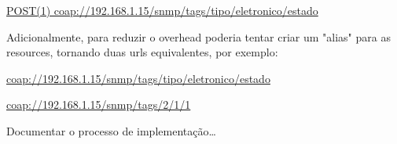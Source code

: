 \documentclass[twoside,english,brazilian]{UNISINOSmonografia}
\begin{document}
\url{POST(1) coap://192.168.1.15/snmp/tags/tipo/eletronico/estado}

Adicionalmente, para reduzir o overhead poderia tentar criar um "alias" para 
as resources, tornando duas urls equivalentes, por exemplo:

\url{coap://192.168.1.15/snmp/tags/tipo/eletronico/estado}

\url{coap://192.168.1.15/snmp/tags/2/1/1}

	
	
	

	Documentar o processo de implementação\ldots
	
	
	
	



%


%
\end{document}
